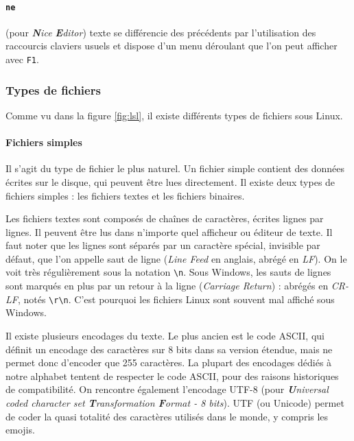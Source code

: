 \paragraph{\texttt{ne}}
 (pour \textit{\textbf{N}ice \textbf{E}ditor}) texte se différencie des précédents par l'utilisation des raccourcis claviers usuels et dispose d'un menu déroulant que l'on peut afficher avec \texttt{F1}.

\newpage
\subsubsection{Types de fichiers} \label{sec:filetypes}

Comme vu dans la figure \ref{fig:lsl}, il existe différents types de fichiers sous Linux.

\paragraph{Fichiers simples}
Il s'agit du type de fichier le plus naturel. Un fichier simple contient des données écrites sur le disque, qui peuvent être lues directement.
Il existe deux types de fichiers simples : les fichiers textes et les fichiers binaires.

Les fichiers textes sont composés de chaînes de caractères, écrites lignes par lignes. Il peuvent être lus dans n'importe quel afficheur ou éditeur de texte. Il faut noter que les lignes sont séparés par un caractère spécial, invisible par défaut, que l'on appelle saut de ligne (\textit{Line Feed} en anglais, abrégé en \textit{LF}). On le voit très régulièrement sous la notation \texttt{\textbackslash n}. Sous Windows, les sauts de lignes sont marqués en plus par un retour à la ligne (\textit{Carriage Return}) : abrégés en \textit{CR-LF}, notés \texttt{\textbackslash r\textbackslash n}. C'est pourquoi les fichiers Linux sont souvent mal affiché sous Windows.

Il existe plusieurs encodages du texte. Le plus ancien est le code ASCII, qui définit un encodage des caractères sur 8 bits dans sa version étendue, mais ne permet donc d'encoder que 255 caractères. La plupart des encodages dédiés à notre alphabet tentent de respecter le code ASCII, pour des raisons historiques de compatibilité. On rencontre également l'encodage UTF-8 (pour \textit{\textbf{U}niversal coded character set \textbf{T}ransformation \textbf{F}ormat - 8 bits}). UTF (ou Unicode) permet de coder la quasi totalité des caractères utilisés dans le monde, y compris les emojis.

